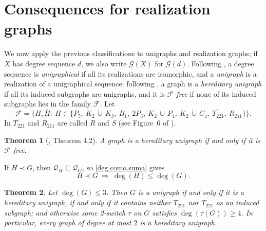 \documentclass[11pt]{article}
\newtheorem{theorem}{Theorem}[section]
\begin{document}


\section{Consequences for realization graphs}
\label{sec_realization}

We now apply the previous classifications to unigraphs and realization
graphs; if $X$ has degree sequence $d$, we also write $\mathcal{G}(X)$ for
$\mathcal{G}(d)$. Following \cite{tyshkevich2000decomposition}, a degree
sequence is \emph{unigraphical} if all its realizations are isomorphic,
and a \emph{unigraph} is a realization of a unigraphical sequence;
following \cite{barrus2012switches}, a graph is a \emph{hereditary
	unigraph} if all its induced subgraphs are unigraphs, and it is
\emph{$\mathcal{F}$-free} if none of its induced subgraphs lies in the
family $\mathcal{F}$. Let
\[
\mathcal{F}=\bigl\{H,\overline{H}:\ H\in\{P_5,\ K_2\,\dot\cup\,K_3,\ B_1,\ 2P_3,\ K_2\,\dot\cup\,P_4,\ K_2\,\dot\cup\,C_4,\ \overline{T_{221}},\ R_{211}\}\bigr\}.
\]
In \cite{barrus2012switches} $\overline{T_{221}}$ and $R_{211}$ are called $R$ and
$S$ (see Figure~6 of
\cite{barrus2012switches}).

\begin{theorem}[\cite{barrus2012switches}, Theorem 4.2]
	\label{barrus.hereditarios}
	A graph is a hereditary unigraph if and only if it is $\mathcal{F}$-free.
\end{theorem}

If $H\prec G$, then $\mathcal{Q}_H\subseteq\mathcal{Q}_G$, so
\eqref{deg.como.suma} gives
\begin{equation}
	\label{deg.monotono}
	H\prec G\ \Longrightarrow\ \deg(H)\leq\deg(G).
\end{equation}

\begin{theorem}
	\label{grado<=3.unigrafo}
	Let $\deg(G)\leq 3$. Then $G$ is a unigraph if and only if it is a
	hereditary unigraph, if and only if it contains neither $T_{221}$ nor
	$\overline{T_{221}}$ as an induced subgraph; and otherwise some
	2-switch $\tau$ on $G$ satisfies $\deg(\tau(G))\geq 4$. In particular,
	every graph of degree at most $2$ is a hereditary unigraph.
\end{theorem}
\end{document}
